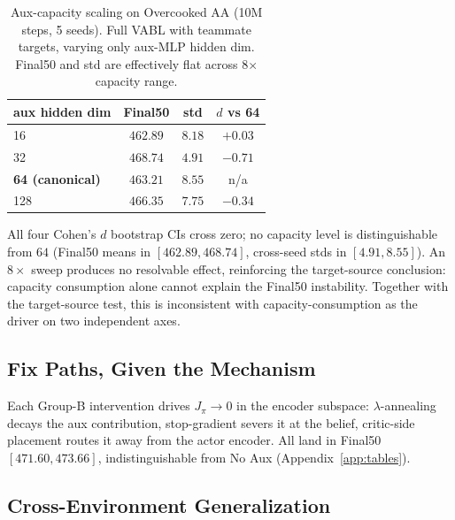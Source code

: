 \documentclass{article}
\theoremstyle{plain}
\theoremstyle{definition}
\theoremstyle{remark}
\begin{document}
\begin{table}[t]
\centering
\caption{Aux-capacity scaling on Overcooked AA (10M steps, 5 seeds). Full VABL with teammate targets, varying only aux-MLP hidden dim. Final50 and std are effectively flat across 8$\times$ capacity range.}
\label{tab:capacity}
\small
\begin{tabular}{lccc}
\toprule
\textbf{aux hidden dim} & \textbf{Final50} & \textbf{std} & \textbf{$d$ vs 64} \\
\midrule
16      & $462.89$ & $8.18$ & $+0.03$ \\
32      & $468.74$ & $4.91$ & $-0.71$ \\
\textbf{64 (canonical)} & $\mathbf{463.21}$ & $\mathbf{8.55}$ & n/a \\
128     & $466.35$ & $7.75$ & $-0.34$ \\
\bottomrule
\end{tabular}
\end{table}

All four Cohen's $d$ bootstrap CIs cross zero; no capacity level is
distinguishable from $64$ (Final50 means in $[462.89, 468.74]$,
cross-seed stds in $[4.91, 8.55]$). An $8\times$ sweep produces no
resolvable effect, reinforcing the target-source conclusion: capacity
consumption alone cannot explain the Final50 instability. Together
with the target-source test, this is inconsistent with
capacity-consumption as the driver on two independent axes.

\subsection{Fix Paths, Given the Mechanism}
\label{sec:fixes}

Each Group-B intervention drives $J_\pi \to 0$ in the encoder
subspace: $\lambda$-annealing decays the aux contribution,
stop-gradient severs it at the belief, critic-side placement routes
it away from the actor encoder. All land in Final50
$[471.60, 473.66]$, indistinguishable from No Aux
(Appendix~\ref{app:tables}).

\subsection{Cross-Environment Generalization}
\label{sec:cross_env}
\end{document}
